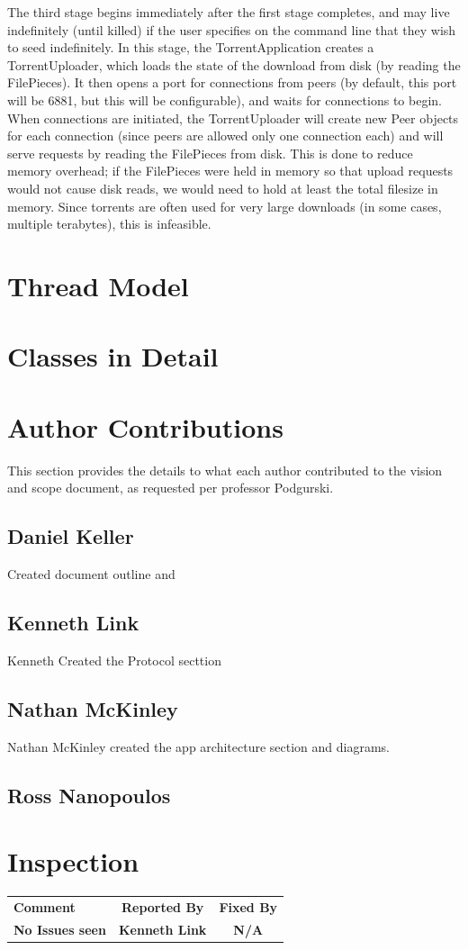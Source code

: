 \documentclass[letter]{scrartcl}
\begin{document}
The third stage begins immediately after the first stage completes, and may live indefinitely (until killed) if the user specifies on the command line that they wish to seed indefinitely.  In this stage, the TorrentApplication creates a TorrentUploader, which loads the state of the download from disk (by reading the FilePieces).  It then opens a port for connections from peers (by default, this port will be 6881, but this will be configurable), and waits for connections to begin.  When connections are initiated, the TorrentUploader will create new Peer objects for each connection (since peers are allowed only one connection each) and will serve requests by reading the FilePieces from disk.  This is done to reduce memory overhead; if the FilePieces were held in memory so that upload requests would not cause disk reads, we would need to hold at least the total filesize in memory.  Since torrents are often used for very large downloads (in some cases, multiple terabytes), this is infeasible.

\section{Thread Model}

\section{Classes in Detail}

\pagebreak
\section{Author Contributions}
This section provides the details to what each author contributed to the vision and scope document, as requested per professor Podgurski.
\subsection{Daniel Keller}
Created document outline and 
\subsection{Kenneth Link}
Kenneth Created the Protocol secttion
\subsection{Nathan McKinley}
Nathan McKinley created the app architecture section and diagrams.
\subsection{Ross Nanopoulos}


\section{Inspection}
\begin{tabularx}{\textwidth}{X c c}
\textbf{Comment} & \textbf{Reported By} & \textbf{Fixed By} \\
\textbf{No Issues seen} & \textbf{Kenneth Link} & \textbf{N/A} \\
\end{tabularx}
\end{document}

